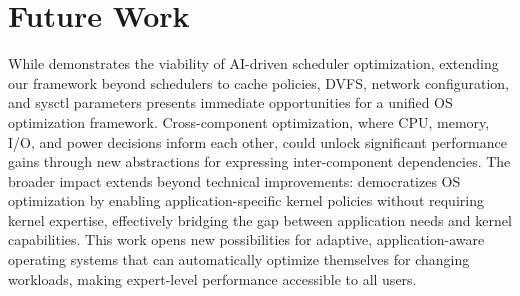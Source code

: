 \section{Future Work}
\label{sec:future}

While \sys demonstrates the viability of AI-driven scheduler optimization, extending our framework beyond schedulers to cache policies, DVFS, network configuration, and sysctl parameters presents immediate opportunities for a unified OS optimization framework. Cross-component optimization, where CPU, memory, I/O, and power decisions inform each other, could unlock significant performance gains through new abstractions for expressing inter-component dependencies. The broader impact extends beyond technical improvements: \sys democratizes OS optimization by enabling application-specific kernel policies without requiring kernel expertise, effectively bridging the gap between application needs and kernel capabilities. This work opens new possibilities for adaptive, application-aware operating systems that can automatically optimize themselves for changing workloads, making expert-level performance accessible to all users.